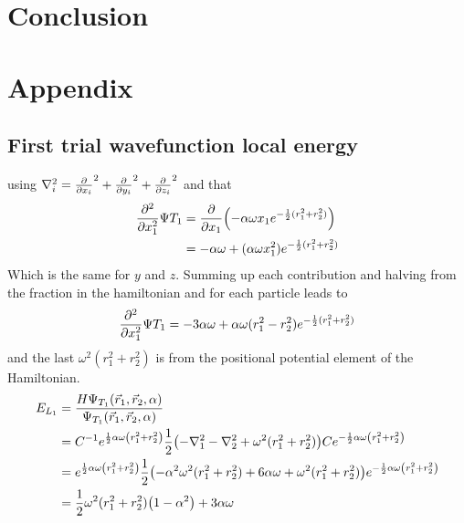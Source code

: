 \documentclass[10pt]{revtex4-1}
\begin{document}
\section{Conclusion}

\section{Appendix}

\subsection{First trial wavefunction local energy}

using $\nabla_i^2 = \pdv{x_i}^2 + \pdv{y_i}^2 + \pdv{z_i}^2$ and that
\begin{align}
    \pdv[2]{x_1} \Psi{T_1} &= \pdv{x_1}\qty( -\alpha \omega x_1 e^{-\frac{1}{2}(r_1^2 + r_2^2)} )\nonumber\\
                                &= -\alpha\omega + (\alpha\omega x_1^2)e^{-\frac{1}{2}(r_1^2 + r_2^2)}
\end{align}
Which is the same for $y$ and $z$. Summing up each contribution and halving from the fraction in the hamiltonian and for each particle leads to
\begin{align}
    \pdv[2]{x_1} \Psi{T_1} = -3\alpha\omega + \alpha\omega (r_1^2 - r_2^2)e^{-\frac{1}{2}(r_1^2 + r_2^2)}
\end{align}
and the last $\omega^2 ( r_1^2 + r_2^2 )$ is from the positional potential element of the Hamiltonian.
\begin{align}
    E_{L_1} &= \frac{H \Psi_{T_1} \qty(\vec{r}_1, \vec{r}_2, \alpha )}{\Psi_{T_1} \qty(\vec{r}_1, \vec{r}_2, \alpha )}\nonumber \\
        &= C^{-1} e^{\frac{1}{2}\alpha \omega \qty(r_{1}^{2} + r_{2}^{2})} \frac{1}{2}\qty(-\nabla_1^2 -\nabla_2^2 + \omega^2(r_1^2 + r_2^2))
          C e^{-\frac{1}{2} \alpha \omega \qty(r_1^2 + r_2^2)} \nonumber \\
        &= e^{\frac{1}{2}\alpha \omega \qty(r_{1}^{2} + r_{2}^{2})}
            \frac{1}{2}\qty(-\alpha^2 \omega^2 (r_1^2 + r_2^2) + 6\alpha \omega + \omega^2 (r_1^2 + r_2^2))
            e^{-\frac{1}{2} \alpha \omega \qty(r_1^2 + r_2^2)} \nonumber \\
        &= \frac{1}{2}\omega^2 (r_1^2 + r_2^2)\qty(1 -\alpha^2 ) + 3\alpha \omega \label{eq:naiveLocalEnergyExpanded}
\end{align}
\end{document}
